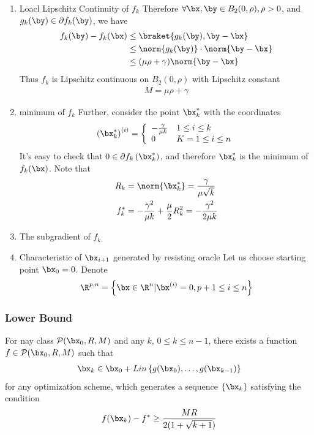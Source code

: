 \begin{enumerate}
    \item Loacl Lipschitz Continuity of $f_k$
    \subitem Therefore $\forall \bx, \by\in B_2(0,\rho),\rho>0$, and $g_k(\by)\in\partial f_k(\by)$, we have
    \begin{align*}
        f_k(\by)-f_k(\bx)&\le \braket{g_k(\by), \by-\bx}\\
        &\le \norm{g_k(\by)}\cdot \norm{\by-\bx}\\
        &\le (\mu\rho+\gamma)\norm{\by-\bx}
    \end{align*}
    Thus $f_k$ is Lipschitz continuous on $B_2(0,\rho)$ with Lipschitz constant
    \begin{align*}
        M=\mu\rho+\gamma
    \end{align*}
    \item minimum of $f_k$
    \subitem Further, consider the point $\bx_k^*$ with the coordinates
    \begin{align*}
        \left( \bx_k^* \right)^{(i)}=\left\{ \begin{array}{ll}
            -\frac{\gamma}{\mu k}& 1\le i\le k\\
            0 & K=1\le i\le n
        \end{array} \right.
    \end{align*}
    It's easy to check that $0\in\partial f_k\left( \bx_k^* \right)$, and therefore $\bx_k^*$ is the minimum of $f_k(\bx)$. Note that
    \begin{align*}
        R_k&=\norm{\bx_k^*}=\frac{\gamma}{\mu \sqrt{k}}\\
        f_k^*&=-\frac{\gamma^2}{\mu k}+\frac{\mu}{2}R_k^2=-\frac{\gamma^2}{2\mu k}
    \end{align*}
    \item The subgradient of $f_k$
    \subitem %
    \item Characteristic of $\bx_{i+1}$ generated by resisting oracle
    \subitem Let us choose starting point $\bx_0=0$. Denote
    \begin{align*}
        \R^{p,n}=\left\{ \bx\in\R^n | \bx^{(i)}=0,p+1\le i\le n \right\}
    \end{align*}
\end{enumerate}

\subsubsection{Lower Bound}

\begin{theorem}
    For nay class $\mathcal{P}(\bx_0, R, M)$ and any $k$, $0\le k\le n-1$, there exists a function $f\in \mathcal{P}(\bx_0, R, M)$ such that
    \begin{align*}
        \bx_k\in\bx_0 +Lin\left\{ g(\bx_0),\dots,g(\bx_{k-1}) \right\}
    \end{align*}
    for any optimization scheme, which generates a  sequence $\left\{ \bx_k \right\}$ satisfying the condition
    \begin{align*}
        f(\bx_k)-f^*\ge \frac{MR}{2(1+\sqrt{k+1})}
    \end{align*}
\end{theorem}

